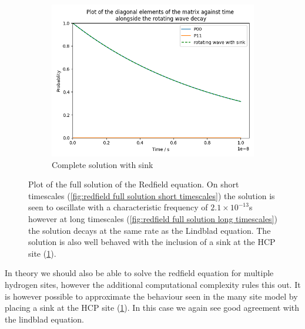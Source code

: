 \begin{figure}[htbp]
\begin{subfigure}{0.45\linewidth}
        \centering
        \includegraphics[width = 0.9\linewidth]{Figures/Redfield/Plot of redfield solution long time sink.png}
        \caption{Complete solution with sink
        }\label{fig:redfield full solution with sink}
    \end{subfigure}
    \caption{Plot of the full solution of the Redfield
    equation. On short timescales
    (\cref{fig:redfield full solution short timescales})
    the solution is seen to
    oscillate with a characteristic
    frequency of \(2.1\times{}10^{-13}\)s however
    at long timescales
    (\cref{fig:redfield full solution long timescales})
    the solution decays at the same rate as the
    Lindblad equation. The solution is
    also well behaved with the inclusion of
    a sink at the HCP site
    (\cref{fig:redfield full solution with sink}).
    }\label{fig:redfield full solution}
\end{figure}
In theory we should also be able
to solve the redfield equation
for multiple hydrogen sites, however
the additional computational complexity
rules this out. It is however possible to
approximate the behaviour
seen in the many site model
by placing a sink at
the HCP site
(\cref{fig:redfield full solution with sink}).
In this case
we again see good
agreement with the
lindblad equation.


